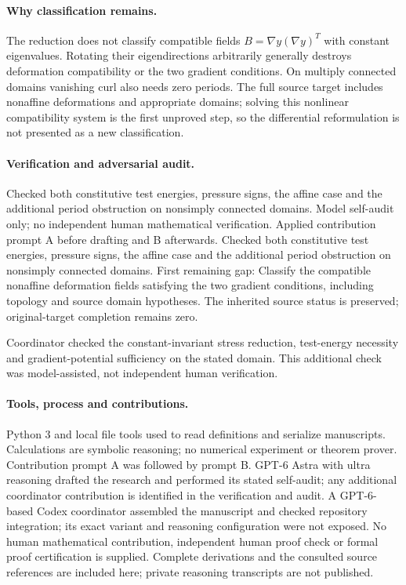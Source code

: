 \documentclass[11pt]{article}
\begin{document}
\paragraph{Why classification remains.} The reduction does not classify compatible fields \(B=\nabla y(\nabla y)^T\) with constant eigenvalues. Rotating their eigendirections arbitrarily generally destroys deformation compatibility or the two gradient conditions. On multiply connected domains vanishing curl also needs zero periods. The full source target includes nonaffine deformations and appropriate domains; solving this nonlinear compatibility system is the first unproved step, so the differential reformulation is not presented as a new classification.

\paragraph{Verification and adversarial audit.}
Checked both constitutive test energies, pressure signs, the affine case and the additional period obstruction on nonsimply connected domains. Model self-audit only; no independent human mathematical verification. Applied contribution prompt A before drafting and B afterwards. Checked both constitutive test energies, pressure signs, the affine case and the additional period obstruction on nonsimply connected domains. First remaining gap: Classify the compatible nonaffine deformation fields satisfying the two gradient conditions, including topology and source domain hypotheses. The inherited source status is preserved; original-target completion remains zero.

Coordinator checked the constant-invariant stress reduction, test-energy necessity and gradient-potential sufficiency on the stated domain. This additional check was model-assisted, not independent human verification.

\paragraph{Tools, process and contributions.}
Python 3 and local file tools used to read definitions and serialize manuscripts. Calculations are symbolic reasoning; no numerical experiment or theorem prover. Contribution prompt A was followed by prompt B. GPT-6 Astra with ultra reasoning drafted the research and performed its stated self-audit; any additional coordinator contribution is identified in the verification and audit. A GPT-6-based Codex coordinator assembled the manuscript and checked repository integration; its exact variant and reasoning configuration were not exposed. No human mathematical contribution, independent human proof check or formal proof certification is supplied. Complete derivations and the consulted source references are included here; private reasoning transcripts are not published.
\end{document}
